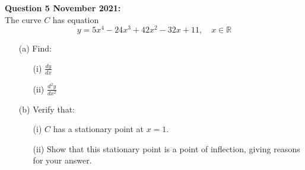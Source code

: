 \documentclass[12pt]{article}
\begin{document}
\textbf{Question 5 November 2021:}\\
The curve \( C \) has equation 
\[y = 5x^4 - 24x^3 + 42x^2 - 32x + 11, \quad x \in \mathbb{R}\]
\begin{enumerate}
    \item[(a)] Find:
    \begin{enumerate}
        \item[(i)] \( \frac{dy}{dx} \)
        \item[(ii)] \( \frac{d^2y}{dx^2} \)
    \end{enumerate}  
    \item[(b)] Verify that:
    \begin{enumerate}
        \item[(i)] \( C \) has a stationary point at \( x = 1 \).
        \item[(ii)] Show that this stationary point is a point of inflection, giving reasons for your answer.
    \end{enumerate}    
\end{enumerate}

\pagebreak 


\pagebreak 

\nocite{*}
\printbibliography{}
\end{document}
